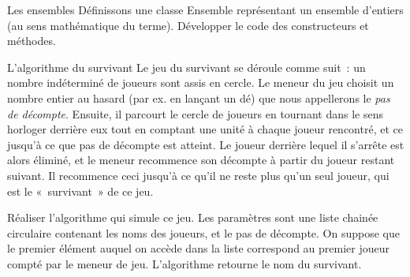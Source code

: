 	\begin{Exercice}{Les ensembles}
		Définissons une classe Ensemble représentant un ensemble d'entiers 
		(au sens mathématique du terme). Développer le code
		des constructeurs et méthodes.

	\end{Exercice}
	
	\begin{Exercice}{L'algorithme du survivant}
		Le jeu du survivant se déroule comme suit~: un nombre indéterminé de joueurs sont assis en cercle. Le meneur du jeu
		choisit un nombre entier au hasard (par ex. en lançant un dé) que nous appellerons le \textit{pas de décompte}.
		Ensuite, il parcourt le cercle de joueurs en tournant dans le sens horloger derrière eux tout en comptant une unité à
		chaque joueur rencontré, et ce jusqu'à ce que pas de décompte est atteint. Le joueur derrière lequel il s'arrête est
		alors éliminé, et le meneur recommence son décompte à partir du joueur restant suivant. Il recommence ceci jusqu'à ce
		qu'il ne reste plus qu'un seul joueur, qui est le «~survivant~» de ce jeu.

		Réaliser l'algorithme qui simule ce jeu. Les paramètres sont une liste chainée circulaire contenant les noms des
		joueurs, et le pas de décompte. On suppose que le premier élément auquel on accède dans la liste correspond au premier
		joueur compté par le meneur de jeu. L'algorithme retourne le nom du survivant.
	\end{Exercice}

